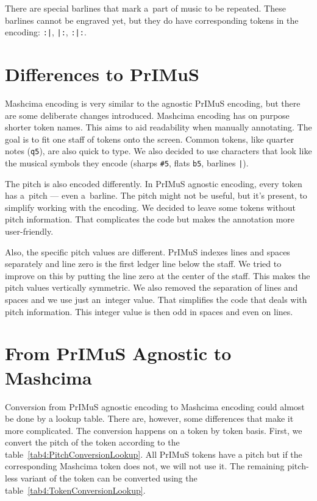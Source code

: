 There are special barlines that mark a~part of music to be repeated. These barlines cannot be engraved yet, but they do have corresponding tokens in the encoding: \verb`:|`, \verb`|:`, \verb`:|:`.


\section{Differences to PrIMuS}

Mashcima encoding is very similar to the agnostic PrIMuS encoding, but there are some deliberate changes introduced. Mashcima encoding has on purpose shorter token names. This aims to aid readability when manually annotating. The goal is to fit one staff of tokens onto the screen. Common tokens, like quarter notes (\verb`q5`), are also quick to type. We also decided to use characters that look like the musical symbols they encode (sharps \verb`#5`, flats \verb`b5`, barlines \verb`|`).

The pitch is also encoded differently. In PrIMuS agnostic encoding, every token has a~pitch --- even a~barline. The pitch might not be useful, but it's present, to simplify working with the encoding. We decided to leave some tokens without pitch information. That complicates the code but makes the annotation more user-friendly.

Also, the specific pitch values are different. PrIMuS indexes lines and spaces separately and line zero is the first ledger line below the staff. We tried to improve on this by putting the line zero at the center of the staff. This makes the pitch values vertically symmetric. We also removed the separation of lines and spaces and we use just an~integer value. That simplifies the code that deals with pitch information. This integer value is then odd in spaces and even on lines.


\section{From PrIMuS Agnostic to Mashcima}

Conversion from PrIMuS agnostic encoding to Mashcima encoding could almost be done by a lookup table. There are, however, some differences that make it more complicated. The conversion happens on a token by token basis. First, we convert the pitch of the token according to the table~\ref{tab4:PitchConversionLookup}. All PrIMuS tokens have a pitch but if the corresponding Mashcima token does not, we will not use it. The remaining pitch-less variant of the token can be converted using the table~\ref{tab4:TokenConversionLookup}.

